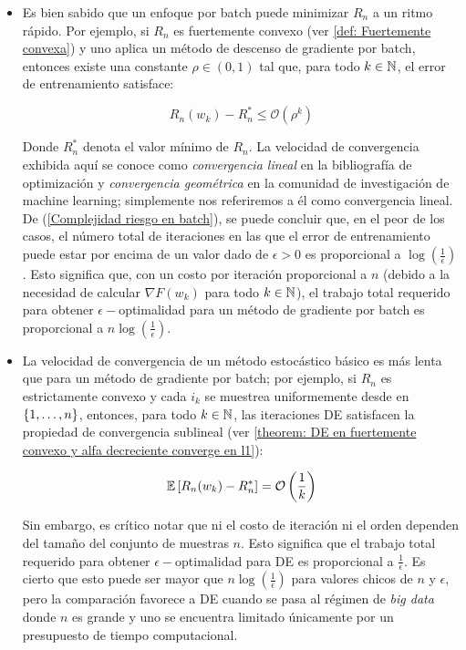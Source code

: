 \begin{itemize}
	\item Es bien sabido que un enfoque por batch puede minimizar $R_n$ a un ritmo r\'apido. Por ejemplo, si $R_n$ es fuertemente convexo (ver \ref{def: Fuertemente convexa}) y uno aplica un m\'etodo de descenso de gradiente por batch, entonces existe una constante $\rho \in (0,1)$ tal que, para todo $k \in {\mathbb{N}}$, el error de entrenamiento satisface:
	
	\begin{equation}
	\label{Complejidad riesgo en batch}
	R_n(w_k) - R_n^* \leq \mathcal{O} \left(\rho^k\right)
	\end{equation}
	
	Donde $R_n^*$ denota el valor m\'inimo de $R_n$. La velocidad de convergencia exhibida aquí se conoce como \textit{convergencia lineal} en la bibliograf\'ia de optimización \cite{ortega:2000} y \textit{convergencia geométrica} en la comunidad de investigación de machine learning; simplemente nos referiremos a él como convergencia lineal. De (\ref{Complejidad riesgo en batch}), se puede concluir que, en el peor de los casos, el número total de iteraciones en las que el error de entrenamiento puede estar por encima de un valor dado de $\epsilon >0$ es proporcional a $\log \left(\frac{1}{\epsilon}\right)$. Esto significa que, con un costo por iteración proporcional a $n$ (debido a la necesidad de calcular $\nabla F(w_k)$ para todo $k \in {\mathbb{N}}$), el trabajo total requerido para obtener $\epsilon-$optimalidad para un método de gradiente por batch es proporcional a $n \log\left(\frac{1}{\epsilon}\right)$.
	
	\item La velocidad de convergencia de un método estocástico básico es más lenta que para un método de gradiente por batch; por ejemplo, si $R_n$ es estrictamente convexo y cada $i_k$ se muestrea uniformemente desde en $\left\lbrace1, \dots, n\right\rbrace$, entonces, para todo $k \in {\mathbb{N}}$, las iteraciones DE satisfacen la propiedad de convergencia sublineal (ver \ref{theorem: DE en fuertemente convexo y alfa decreciente converge en l1}):
	
	\begin{equation}
	\label{Complejidad riesgo en de}
	\mathbb{E} \left[R_n(w_k) - R_n^*\right] = \mathcal{O} \left(\frac{1}{k}\right)
	\end{equation}
	
	Sin embargo, es cr\'itico notar que ni el costo de iteración ni el orden dependen del tamaño del conjunto de muestras $n$. Esto significa que el trabajo total requerido para obtener $\epsilon-$optimalidad para DE es proporcional a $\frac{1}{\epsilon}$. Es cierto que esto puede ser mayor que $n \log \left(\frac{1}{\epsilon}\right)$ para valores chicos de $n$ y $\epsilon$, pero la comparación favorece a DE cuando se pasa al régimen de \textit{big data} donde $n$ es grande y uno se encuentra limitado \'unicamente por un presupuesto de tiempo computacional.
	

\end{itemize}
